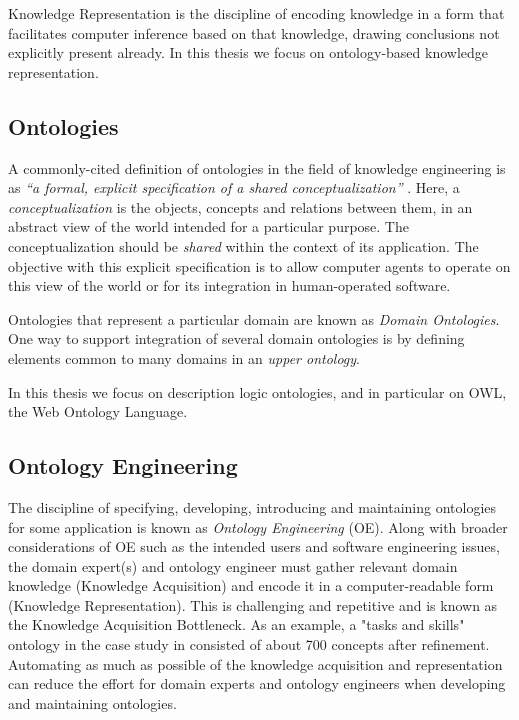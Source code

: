 \documentclass[a4paper]{report}
\newcommand{\todo}[1]{}
\begin{document}
Knowledge Representation is the discipline of encoding knowledge in a form that facilitates computer inference based on that knowledge, drawing conclusions not explicitly present already.
In this thesis we focus on ontology-based knowledge representation.

\subsection{Ontologies}
\label{sec:lit-rev:ontologies}

A commonly-cited definition of ontologies in the field of knowledge engineering is as \emph{``a formal, explicit specification of a shared conceptualization''} \cite{StuderEtAl1998KEPM}.
Here, a \emph{conceptualization} is the objects, concepts and relations between them, in an abstract view of the world intended for a particular purpose.
The conceptualization should be \emph{shared} within the context of its application.
The objective with this explicit specification is to allow computer agents to operate on this view of the world or for its integration in human-operated software.

Ontologies that represent a particular domain are known as \emph{Domain Ontologies}.
One way to support integration of several domain ontologies is by defining elements common to many domains in an \emph{upper ontology}\cite{SemanticIntegration2004Noy}.

\todo{could distinguish between "lexical" and non-lexical ontologies like what Hjelm and I think Cimiano refers to.}

In this thesis we focus on description logic ontologies, and in particular on OWL, the Web Ontology Language.

\subsection{Ontology Engineering}

The discipline of specifying, developing, introducing and maintaining ontologies for some application is known as \emph{Ontology Engineering} (OE)\cite{HOO2009OntEngMeth}.
Along with broader considerations of OE such as the intended users and software engineering issues, the domain expert(s) and ontology engineer must gather relevant domain knowledge (Knowledge Acquisition) and encode it in a computer-readable form (Knowledge Representation)\cite{OntMethOverv1999}.
This is challenging and repetitive and is known as the Knowledge Acquisition Bottleneck\cite{OLforSemWeb2001}.
As an example, a "tasks and skills" ontology in the case study in \cite{HOO2009OntEngMeth} consisted of about 700 concepts after refinement.
Automating as much as possible of the knowledge acquisition and representation can reduce the effort for domain experts and ontology engineers when developing and maintaining ontologies\todo{need to back this up}.
\end{document}
